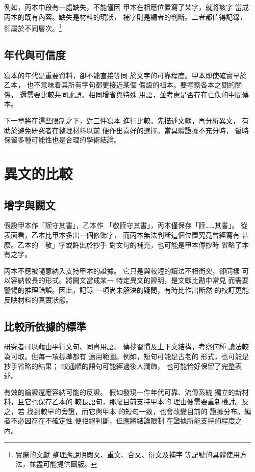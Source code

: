 \documentclass[lang=zh]{impebook}
\begin{document}
例如，丙本中段有一處缺失，不能僅因
甲本在相應位置寫了某字，就將該字
當成丙本的既有內容。缺失是材料的現狀，
補字則是編者的判斷。二者都值得記錄，
卻屬於不同層次。\footnote{實際的文獻
整理應說明闕文、重文、合文、衍文及補字
等記號的具體使用方法，並盡可能提供圖版。}

\section{年代與可信度}
寫本的年代是重要資料，卻不能直接等同
於文字的可靠程度。甲本即使確實早於乙本，
也不意味着其所有字句都更接近某個
假設的祖本。要考察各本之間的關係，
還需要比較共同訛誤、相同增省與特殊
用語，並考慮是否存在亡佚的中間傳本。

下一章將在這些限制之下，對三件寫本
進行比較。先描述文獻，再分析異文，
有助於避免研究者在整理材料以前
便作出喜好的選擇。當具體證據不充分時，
暫時保留多種可能性也是合理的學術結論。

\chapter{異文的比較}\label{chap:variants}
\section{增字與闕文}
假設甲本作「謹守其書」，乙本作
「敬謹守其書」，丙本僅保存「謹……其書」。
從表面看，乙本比甲本多出一個修飾字，
而丙本無法判斷這個位置究竟曾經寫有
甚麼。乙本的「敬」字或許出於抄手
對文句的補充，也可能是甲本傳抄時
省略了本有之字。

丙本不應被隨意納入支持甲本的證據。
它只是與較短的讀法不相衝突，卻同樣
可以容納較長的形式。將闕文當成某一
特定異文的證明，是文獻比勘中常見
而需要警惕的推理錯誤。因此，記錄
一項尚未解決的疑問，有時比作出斷然
的校訂更能反映材料的真實狀態。

\section{比較所依據的標準}
研究者可以藉由平行文句、同書用語、
傳抄習慣及上下文結構，考察何種
讀法較為可取。但每一項標準都有
適用範圍。例如，短句可能是古老的
形式，也可能是抄手省略的結果；
較通順的語句可能經過後人潤飾，
也可能恰好保留了完整表述。

有效的論證還應容納可能的反證。
假如發現一件年代可靠、流傳系統
獨立的新材料，且它也保存乙本的
較長語句，那麼目前支持甲本的
理由便需要重新檢討。反之，若
找到較早的旁證，而它與甲本
的短句一致，也會改變目前的
證據分布。編者不必因存在不確定性
便拒絕判斷，但應將結論限制
在證據所能支持的程度之內。
\end{document}
